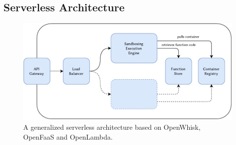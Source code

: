 \subsection{Serverless Architecture}

\begin{figure}[ht!]
    \includegraphics[width=\textwidth]{figures/ServerlessArchitecture.pdf}
    \caption{A generalized serverless architecture based on OpenWhisk, OpenFaaS and OpenLambda.}
    \label{fig:serverless-architecture}
\end{figure}

